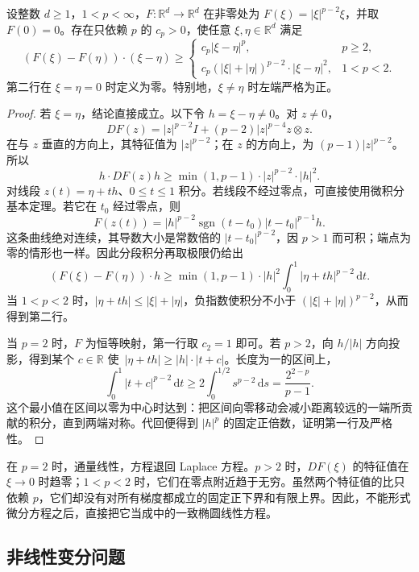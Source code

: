 \begin{lemma}[通量的严格单调性]
\label{b2:lem:H2-monotonicity}
设整数 \(d\ge1\)，\(1<p<\infty\)，\(F:\mathbb R^d\to\mathbb R^d\) 在非零处为 \(F(\xi)=|\xi|^{p-2}\xi\)，并取 \(F(0)=0\)。存在只依赖 \(p\) 的 \(c_p>0\)，使任意 \(\xi,\eta\in\mathbb R^d\) 满足
\[
 (F(\xi)-F(\eta))\cdot(\xi-\eta)\ge
 \begin{cases}
 c_p|\xi-\eta|^p,&p\ge2,\\
 c_p(|\xi|+|\eta|)^{p-2}\cdot|\xi-\eta|^2,&1<p<2.
 \end{cases}
\]
第二行在 \(\xi=\eta=0\) 时定义为零。特别地，\(\xi\ne\eta\) 时左端严格为正。
\end{lemma}
\begin{proof}
若 \(\xi=\eta\)，结论直接成立。以下令 \(h=\xi-\eta\ne0\)。对 \(z\ne0\)，
\[
 DF(z)=|z|^{p-2}I+(p-2)|z|^{p-4}z\otimes z.
\]
在与 \(z\) 垂直的方向上，其特征值为 \(|z|^{p-2}\)；在 \(z\) 的方向上，为 \((p-1)|z|^{p-2}\)。所以
\[
 h\cdot DF(z)h\ge\min(1,p-1)\cdot|z|^{p-2}\cdot|h|^2.
\]
对线段 \(z(t)=\eta+th\)、\(0\le t\le1\) 积分。若线段不经过零点，可直接使用微积分基本定理。若它在 \(t_0\) 经过零点，则
\[
 F(z(t))=|h|^{p-2}\operatorname{sgn}(t-t_0)
             |t-t_0|^{p-1}h.
\]
这条曲线绝对连续，其导数大小是常数倍的 \(|t-t_0|^{p-2}\)，因 \(p>1\) 而可积；端点为零的情形也一样。因此分段积分再取极限仍给出
\[
 (F(\xi)-F(\eta))\cdot h
 \ge\min(1,p-1)\cdot|h|^2
       \int_0^1|\eta+th|^{p-2}\,\mathrm dt.
\]
当 \(1<p<2\) 时，\(|\eta+th|\le|\xi|+|\eta|\)，负指数使积分不小于 \((|\xi|+|\eta|)^{p-2}\)，从而得到第二行。

当 \(p=2\) 时，\(F\) 为恒等映射，第一行取 \(c_2=1\) 即可。若 \(p>2\)，向 \(h/|h|\) 方向投影，得到某个 \(c\in\mathbb R\) 使
\(\,|\eta+th|\ge|h|\cdot|t+c|\)。长度为一的区间上，
\[
 \int_0^1|t+c|^{p-2}\,\mathrm dt
 \ge 2\int_0^{1/2}s^{p-2}\,\mathrm ds
 =\frac{2^{2-p}}{p-1}.
\]
这个最小值在区间以零为中心时达到：把区间向零移动会减小距离较远的一端所贡献的积分，直到两端对称。代回便得到 \(|h|^p\) 的固定正倍数，证明第一行及严格性。
\end{proof}

在 \(p=2\) 时，通量线性，方程退回 Laplace 方程。\(p>2\) 时，\(DF(\xi)\) 的特征值在 \(\xi\to0\) 时趋零；\(1<p<2\) 时，它们在零点附近趋于无穷。虽然两个特征值的比只依赖 \(p\)，它们却没有对所有梯度都成立的固定正下界和有限上界。因此，不能形式微分方程之后，直接把它当成中的一致椭圆线性方程。

\subsection{非线性变分问题}
\label{b2:subsec:H20203}

